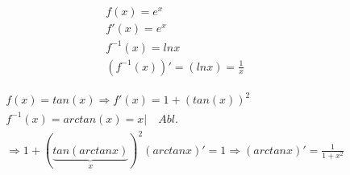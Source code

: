 \begin{example}
\begin{align*}
f(x)=e^x\\
f'(x)=e^x\\
f^{-1}(x)=lnx\\
(f^{-1}(x))'=(lnx)=\frac{1}{x}
\end{align*}
\end{example}

\begin{example}
\begin{gather*}
f(x) = tan(x) \Rightarrow f'(x) = 1+(tan(x))^2\\
f^{-1}(x)= arctan(x) = x  | \quad Abl.\\
\Rightarrow 1 + ( \underbrace{tan(arctan x)}_{x})^2(arctanx)' = 1 \Rightarrow (arctanx)'=\frac{1}{1+x^2}
\end{gather*}
\end{example}

